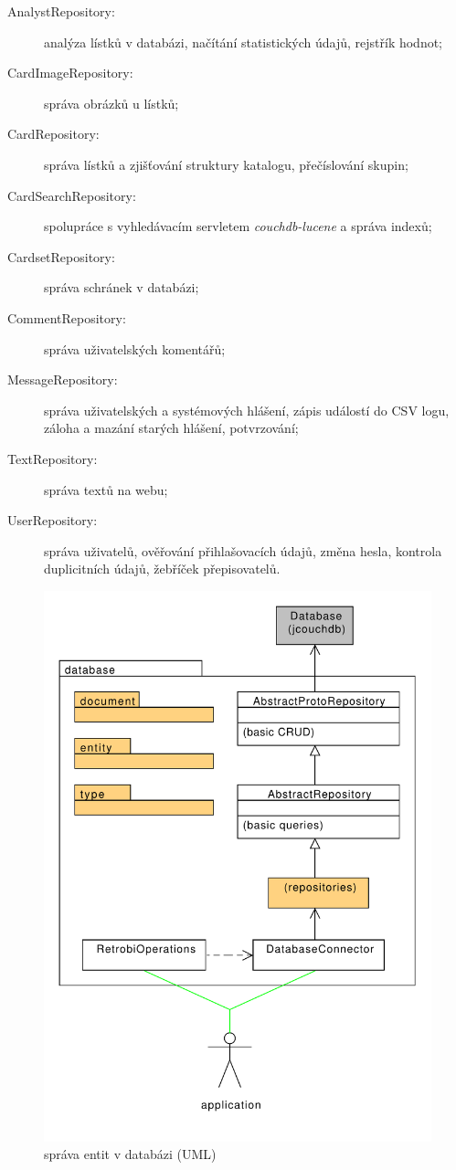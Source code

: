 \begin{description}
\item[AnalystRepository:]{analýza lístků v databázi, načítání statistických údajů, rejstřík hodnot;}
\item[CardImageRepository:]{správa obrázků u lístků;}
\item[CardRepository:]{správa lístků a zjišťování struktury katalogu, přečíslování skupin;}
\item[CardSearchRepository:]{spolupráce s vyhledávacím servletem {\em couchdb-lucene} a správa indexů;}
\item[CardsetRepository:]{správa schránek v databázi;}
\item[CommentRepository:]{správa uživatelských komentářů;}
\item[MessageRepository:]{správa uživatelských a systémových hlášení, zápis událostí do CSV logu, záloha a mazání starých hlášení, potvrzování;}
\item[TextRepository:]{správa textů na webu;}
\item[UserRepository:]{správa uživatelů, ověřování přihlašovacích údajů, změna hesla, kontrola duplicitních údajů, žebříček přepisovatelů.}
\end{description}

\begin{figure}
\label{fig:uml_database}
\centering
\includegraphics[width=.7\textwidth]{uml_database.pdf}
\caption{správa entit v databázi (UML)}
\end{figure}

